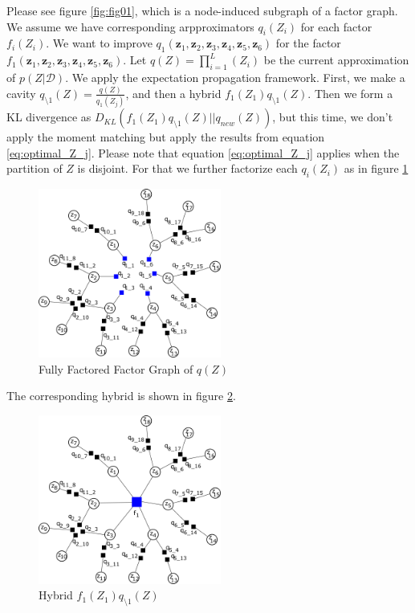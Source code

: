 \documentclass[a4]{article}
\begin{document}
Please see figure \ref{fig:fig01}, which is a node-induced subgraph of a factor graph.
We assume we have corresponding arpproximators $q_i(Z_i)$ for each factor $f_i(Z_i)$.
We want to improve $q_1(\bm{z}_1, \bm{z}_2, \bm{z}_3, \bm{z}_4, \bm{z}_5, \bm{z}_6)$ for the factor
$f_1(\bm{z}_1, \bm{z}_2, \bm{z}_3, \bm{z}_4, \bm{z}_5, \bm{z}_6)$.
Let $q(Z) = \prod_{i=1}^L(Z_i)$ be the current approximation of $p(Z|\mathcal{D})$.
We apply the expectation propagation framework.
First, we make a cavity $q_{\setminus 1}(Z) = \frac{q(Z)}{q_1(Z_j)}$, and then a hybrid
$f_1(Z_1)q_{\setminus 1}(Z)$.
Then we form a KL divergence as $D_{KL}(f_1(Z_1)q_{\setminus 1}(Z)||q_{new}(Z))$, but this time,
we don't apply the moment matching but apply the results from equation \ref{eq:optimal_Z_j}.
Please note that equation \ref{eq:optimal_Z_j} applies when the partition of $Z$ is disjoint.
For that we further factorize each $q_i(Z_i)$ as in figure \ref{fig:fig02}


\begin{figure}[!htb]
\centering
\includegraphics[width=6cm]{fig02.png}
\caption{Fully Factored Factor Graph of $q(Z)$}
\label{fig:fig02}
\end{figure}

The corresponding hybrid is shown in figure \ref{fig:fig03}.

\begin{figure}[!htb]
\centering
\includegraphics[width=6cm]{fig03.png}
\caption{Hybrid $f_1(Z_1)q_{\setminus 1}(Z)$}
\label{fig:fig03}
\end{figure}
\end{document}
